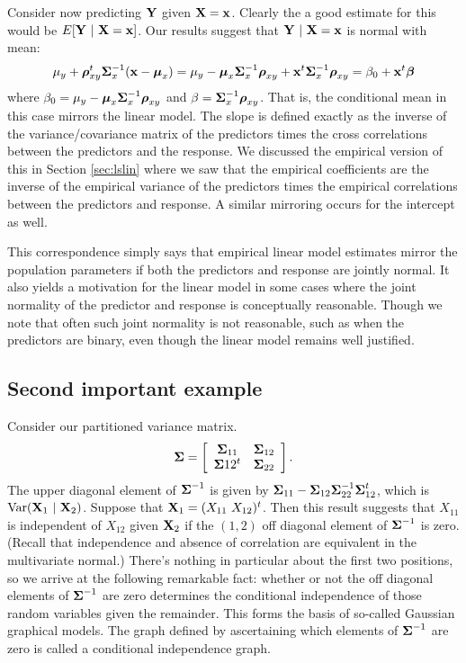 Consider now predicting $\mathbf{Y}$ given $\mathbf{X} = \mathbf{x}$. Clearly the a good estimate
for this would be $E[\mathbf{Y} ~|~ \mathbf{X} = \mathbf{x}]$. Our results
suggest that $\mathbf{Y} ~|~ \mathbf{X} = \mathbf{x}$ is normal with mean:
$$
\mu_y + \boldsymbol{\rho}_{xy}^t\boldsymbol{\Sigma}_x^{-1} (\mathbf{x} - \boldsymbol{\mu}_x)
= \mu_y - \boldsymbol{\mu}_x \boldsymbol{\Sigma}_x^{-1}\boldsymbol{\rho}_{xy} + \mathbf{x}^t \boldsymbol{\Sigma}_x^{-1} \boldsymbol{\rho}_{xy}
= \beta_0 + \mathbf{x}^t \boldsymbol{\beta}
$$
where $\beta_0 = \mu_y - \boldsymbol{\mu}_x \boldsymbol{\Sigma}_x^{-1}\boldsymbol{\rho}_{xy}$ and $\beta = \boldsymbol{\Sigma}_x^{-1} \boldsymbol{\rho}_{xy}$. That is, the conditional mean in this case mirrors the
linear model. The slope is defined exactly as the inverse of the variance/covariance matrix
of the predictors times the cross correlations between the predictors and the response.
We discussed the empirical version of this in Section \ref{sec:lslin} where we
saw that the empirical coefficients are the inverse of the empirical variance of 
the predictors times the empirical correlations between the predictors and response. 
A similar mirroring occurs for the intercept as well. 

This correspondence simply says that empirical linear model estimates mirror the population parameters if both the predictors and response are jointly normal. It also yields
a motivation for the linear model in some cases where the joint normality of the
predictor and response is conceptually reasonable. Though we note that often such
joint normality is not reasonable, such as when the predictors are binary, even
though the linear model remains well justified. 

\subsection{Second important example}
Consider our partitioned variance matrix. 
$$
\boldsymbol{\Sigma} = \left[
\begin{array}{cc}
\boldsymbol{\Sigma}_{11} & \boldsymbol{\Sigma}_{12} \\
\boldsymbol{\Sigma}{12}^t & \boldsymbol{\Sigma}_{22}
\end{array}
\right].
$$
The upper diagonal element of $\boldsymbol{\Sigma}^{-1}$ is given by  $\boldsymbol{\Sigma}_{11} - \boldsymbol{\Sigma}_{12} \boldsymbol{\Sigma}_{22}^{-1} \boldsymbol{\Sigma}_{12}^t$, which is $\mbox{Var}(\mathbf{X}_1 ~|~ \mathbf{X}_2)$. Suppose that
$\mathbf{X}_1 = (X_{11} ~ X_{12})^t$. Then this result suggests that
$X_{11}$ is independent of $X_{12}$ given $\mathbf{X}_2$ if the $(1,2)$ off diagonal element
of $\boldsymbol{\Sigma}^{-1}$ is zero. (Recall that independence and absence of correlation are
equivalent in the multivariate normal.) There's nothing in particular about the
first two positions, so we arrive at the following remarkable fact: whether or not
the off diagonal elements of $\boldsymbol{\Sigma}^{-1}$ are zero determines the conditional
independence of those random variables given the remainder. This forms the
basis of so-called Gaussian graphical models. The graph defined by ascertaining
which elements of $\boldsymbol{\Sigma}^{-1}$ are zero is called a conditional independence graph.



